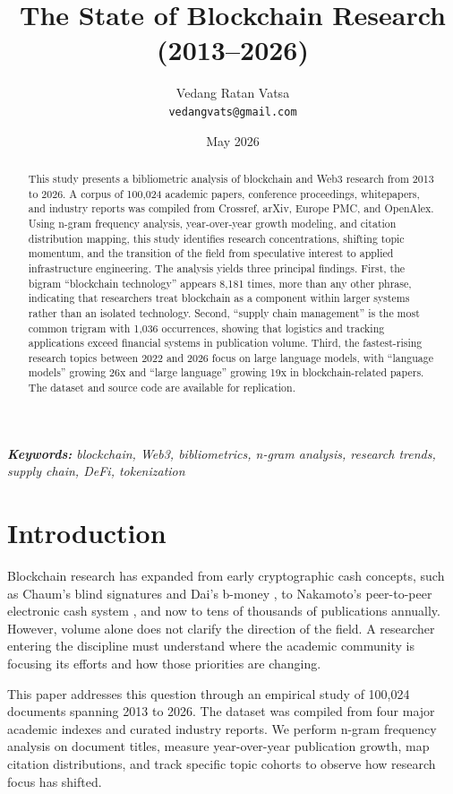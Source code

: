 \documentclass[11pt]{article}
\title{The State of Blockchain Research (2013--2026)}
\author{
  Vedang Ratan Vatsa \\
  \texttt{vedangvats@gmail.com}
}
\date{May 2026}
\begin{document}
\maketitle

\begin{abstract}
This study presents a bibliometric analysis of blockchain and Web3 research from 2013 to 2026. A corpus of 100,024 academic papers, conference proceedings, whitepapers, and industry reports was compiled from Crossref, arXiv, Europe PMC, and OpenAlex. Using n-gram frequency analysis, year-over-year growth modeling, and citation distribution mapping, this study identifies research concentrations, shifting topic momentum, and the transition of the field from speculative interest to applied infrastructure engineering. The analysis yields three principal findings. First, the bigram ``blockchain technology'' appears 8,181 times, more than any other phrase, indicating that researchers treat blockchain as a component within larger systems rather than an isolated technology. Second, ``supply chain management'' is the most common trigram with 1,036 occurrences, showing that logistics and tracking applications exceed financial systems in publication volume. Third, the fastest-rising research topics between 2022 and 2026 focus on large language models, with ``language models'' growing 26x and ``large language'' growing 19x in blockchain-related papers. The dataset and source code are available for replication.
\end{abstract}

\noindent\textit{\textbf{Keywords:} blockchain, Web3, bibliometrics, n-gram analysis, research trends, supply chain, DeFi, tokenization}

\section{Introduction}
\label{sec:intro}

Blockchain research has expanded from early cryptographic cash concepts, such as Chaum's blind signatures \citep{chaum1983blind} and Dai's b-money \citep{dai1998bmoney}, to Nakamoto's peer-to-peer electronic cash system \citep{nakamoto2008bitcoin}, and now to tens of thousands of publications annually. However, volume alone does not clarify the direction of the field. A researcher entering the discipline must understand where the academic community is focusing its efforts and how those priorities are changing.

This paper addresses this question through an empirical study of 100,024 documents spanning 2013 to 2026. The dataset was compiled from four major academic indexes and curated industry reports. We perform n-gram frequency analysis on document titles, measure year-over-year publication growth, map citation distributions, and track specific topic cohorts to observe how research focus has shifted.
\end{document}
